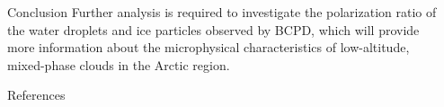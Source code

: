 \documentclass[final]{beamer}
\newlength{\sepwidth}
\newlength{\colwidth}
\newcommand{\separatorcolumn}{\begin{column}{\sepwidth}\end{column}}
\begin{document}
\begin{frame}[t]
\begin{columns}[t]
\begin{column}{\colwidth}
\begin{block}{Conclusion}
        Further analysis is required to investigate the polarization ratio of the water droplets and ice particles observed by BCPD, which will provide more information about the microphysical characteristics of low-altitude, mixed-phase clouds in the Arctic region.
      \end{block}

      \begin{block}{References}
        \nocite{*}
        \footnotesize{}
      \end{block}

    \end{column}

    \separatorcolumn
  \end{columns}

\end{frame}
\end{document}
